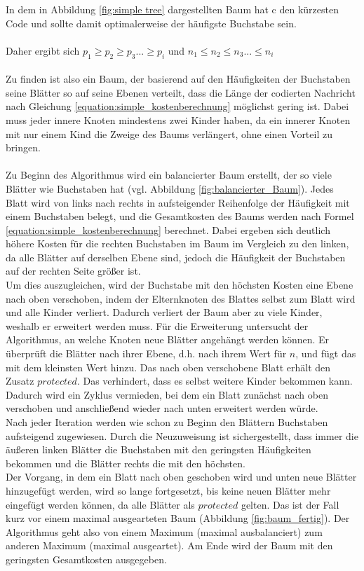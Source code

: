 \documentclass[a4paper,12pt,ngerman]{scrartcl}
\begin{document}
In dem in Abbildung \ref{fig:simple tree} dargestellten Baum hat c den kürzesten Code und sollte damit optimalerweise der häufigste Buchstabe sein.\\
\\
Daher ergibt sich $p_1 \geq p_2 \geq p_3 ... \geq p_i$ und $n_1 \leq n_2 \leq n_3 ... \leq n_i$\\
\\
Zu finden ist also ein Baum, der basierend auf den Häufigkeiten der Buchstaben seine Blätter so auf seine Ebenen verteilt, dass die Länge der codierten Nachricht nach Gleichung \eqref{equation:simple_kostenberechnung} möglichst gering ist. 
Dabei muss jeder innere Knoten mindestens zwei Kinder haben, da ein innerer Knoten mit nur einem Kind die Zweige des Baums verlängert, ohne einen Vorteil zu bringen.\\
\\
Zu Beginn des Algorithmus wird ein balancierter Baum erstellt, der so viele Blätter wie Buchstaben hat (vgl. Abbildung \ref{fig:balancierter_Baum}).
Jedes Blatt wird von links nach rechts in aufsteigender Reihenfolge der Häufigkeit mit einem Buchstaben belegt, und die Gesamtkosten des Baums werden nach Formel \eqref{equation:simple_kostenberechnung} berechnet. 
Dabei ergeben sich deutlich höhere Kosten für die rechten Buchstaben im Baum im Vergleich zu den linken, da alle Blätter auf derselben Ebene sind, jedoch die Häufigkeit der Buchstaben auf der rechten Seite größer ist.\\
Um dies auszugleichen, wird der Buchstabe mit den höchsten Kosten eine Ebene nach oben verschoben,
indem der Elternknoten des Blattes selbst zum Blatt wird und alle Kinder verliert.
Dadurch verliert der Baum aber zu viele Kinder, weshalb er erweitert werden muss.
Für die Erweiterung untersucht der Algorithmus, an welche Knoten neue Blätter angehängt werden können. Er überprüft die Blätter nach ihrer Ebene, d.h. nach ihrem Wert für $n$,
und fügt das mit dem kleinsten Wert hinzu.
Das nach oben verschobene Blatt erhält den Zusatz $protected$. 
Das verhindert, dass es selbst weitere Kinder bekommen kann.
Dadurch wird ein Zyklus vermieden, bei dem ein Blatt zunächst nach oben verschoben und anschließend wieder nach unten erweitert werden würde.\\
Nach jeder Iteration werden wie schon zu Beginn den Blättern Buchstaben aufsteigend zugewiesen.
Durch die Neuzuweisung ist sichergestellt, dass immer die äußeren linken Blätter die Buchstaben mit den geringsten Häufigkeiten bekommen und die Blätter rechts die mit den höchsten.\\
Der Vorgang, in dem ein Blatt nach oben geschoben wird und unten neue Blätter hinzugefügt werden, wird so lange fortgesetzt, bis keine neuen Blätter mehr eingefügt werden können, da alle Blätter als $protected$ gelten.
Das ist der Fall kurz vor einem maximal ausgearteten Baum (Abbildung \ref{fig:baum_fertig}).
Der Algorithmus geht also von einem Maximum (maximal ausbalanciert) zum anderen Maximum (maximal ausgeartet).
Am Ende wird der Baum mit den geringsten Gesamtkosten ausgegeben.
\end{document}
